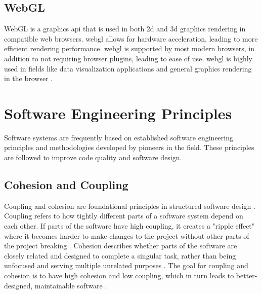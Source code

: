 \subsection{WebGL}
\label{sec:webgl_theory}

WebGL is a graphics \acrshort{api} that is used in both 2d and 3d graphics rendering in compatible web browsers. \acrshort{webgl} allows for hardware acceleration, leading to more efficient rendering performance. \acrshort{webgl} is supported by most modern browsers, in addition to not requiring browser plugins, leading to ease of use. \acrshort{webgl} is highly used in fields like data visualization applications and general graphics rendering in the browser \parencite{mozilla_webgl,sitepoint_webgl}.
\section{Software Engineering Principles}
\label{sec:software_principles_theory}

Software systems are frequently based on established software engineering principles and methodologies developed by pioneers in the field. These principles are followed to improve code quality and software design. 

\subsection{Cohesion and Coupling}
\label{sec:cohesion_coupling_theory}

Coupling and cohesion are foundational principles in structured software design \parencite{openlearn_coupling_cohesion}. Coupling refers to how tightly different parts of a software system depend on each other. If parts of the software have high coupling, it creates a "ripple effect" where it becomes harder to make changes to the project without other parts of the project breaking \parencite{openlearn_coupling_cohesion}. Cohesion describes whether parts of the software are closely related and designed to complete a singular task, rather than being unfocused and serving multiple unrelated purposes \parencite{openlearn_coupling_cohesion}. The goal for coupling and cohesion is to have high cohesion and low coupling, which in turn leads to better-designed, maintainable software \parencite{openlearn_coupling_cohesion}.

